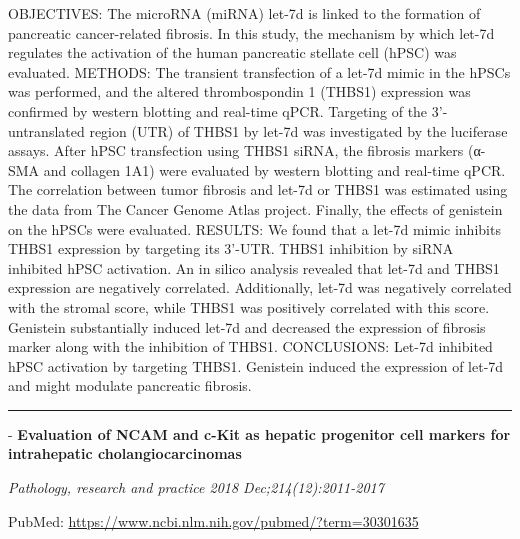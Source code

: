 \documentclass[]{article}
\begin{document}
OBJECTIVES: The microRNA (miRNA) let-7d is linked to the formation of
pancreatic cancer-related fibrosis. In this study, the mechanism by
which let-7d regulates the activation of the human pancreatic stellate
cell (hPSC) was evaluated. METHODS: The transient transfection of a
let-7d mimic in the hPSCs was performed, and the altered thrombospondin
1 (THBS1) expression was confirmed by western blotting and real-time
qPCR. Targeting of the 3'-untranslated region (UTR) of THBS1 by let-7d
was investigated by the luciferase assays. After hPSC transfection using
THBS1 siRNA, the fibrosis markers (α-SMA and collagen 1A1) were
evaluated by western blotting and real-time qPCR. The correlation
between tumor fibrosis and let-7d or THBS1 was estimated using the data
from The Cancer Genome Atlas project. Finally, the effects of genistein
on the hPSCs were evaluated. RESULTS: We found that a let-7d mimic
inhibits THBS1 expression by targeting its 3'-UTR. THBS1 inhibition by
siRNA inhibited hPSC activation. An in silico analysis revealed that
let-7d and THBS1 expression are negatively correlated. Additionally,
let-7d was negatively correlated with the stromal score, while THBS1 was
positively correlated with this score. Genistein substantially induced
let-7d and decreased the expression of fibrosis marker along with the
inhibition of THBS1. CONCLUSIONS: Let-7d inhibited hPSC activation by
targeting THBS1. Genistein induced the expression of let-7d and might
modulate pancreatic fibrosis.

{}

{}

\begin{center}\rule{0.5\linewidth}{\linethickness}\end{center}

 - \textbf{Evaluation of NCAM and c-Kit as hepatic progenitor cell
markers for intrahepatic cholangiocarcinomas}

\emph{Pathology, research and practice 2018 Dec;214(12):2011-2017}

PubMed: \url{https://www.ncbi.nlm.nih.gov/pubmed/?term=30301635}
\end{document}
